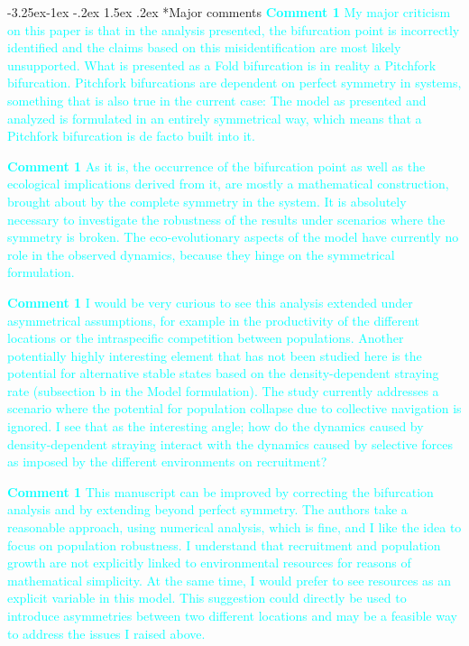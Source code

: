 \documentclass[ucm,12pt]{ucletter}
\makeatletter
\newcounter{section}
\newcounter{subsection}[section]
\newcommand\subsection{\@startsection{subsection}{2}{\z@}%
                                     {-3.25ex\@plus -1ex \@minus -.2ex}%
                                     {1.5ex \@plus .2ex}%
                                     {\normalfont\large\bfseries}}
\makeatother
\begin{document}
\begin{letter}
\subsection*{Major comments}
\noindent \textcolor{cyan}{
{\bf Comment 1} My major criticism on this paper is that in the analysis presented, the bifurcation point is incorrectly identified and the claims based on this misidentification are most likely unsupported. What is presented as a Fold bifurcation is in reality a Pitchfork bifurcation. Pitchfork bifurcations are dependent on perfect symmetry in systems, something that is also true in the current case: The model as presented and analyzed is formulated in an entirely symmetrical way, which means that a Pitchfork bifurcation is de facto built into it.
}

\noindent \textcolor{cyan}{
{\bf Comment 1} As it is, the occurrence of the bifurcation point as well as the ecological implications derived from it, are mostly a mathematical construction, brought about by the complete symmetry in the system. It is absolutely necessary to investigate the robustness of the results under scenarios where the symmetry is broken. The eco-evolutionary aspects of the model have currently no role in the observed dynamics, because they hinge on the symmetrical formulation.
}

\noindent \textcolor{cyan}{
{\bf Comment 1} I would be very curious to see this analysis extended under asymmetrical assumptions, for example in the productivity of the different locations or the intraspecific competition between populations. Another potentially highly interesting element that has not been studied here is the potential for alternative stable states based on the density-dependent straying rate (subsection b in the Model formulation). The study currently addresses a scenario where the potential for population collapse due to collective navigation is ignored. I see that as the interesting angle; how do the dynamics caused by density-dependent straying interact with the dynamics caused by selective forces as imposed by the different environments on recruitment?
}

\noindent \textcolor{cyan}{
{\bf Comment 1} This manuscript can be improved by correcting the bifurcation analysis and by extending beyond perfect symmetry. The authors take a reasonable approach, using numerical analysis, which is fine, and I like the idea to focus on population robustness.  I understand that recruitment and population growth are not explicitly linked to environmental resources for reasons of mathematical simplicity. At the same time, I would prefer to see resources as an explicit variable in this model. This suggestion could directly be used to introduce asymmetries between two different locations and may be a feasible way to address the issues I raised above.
}





\end{letter}
\end{document}
